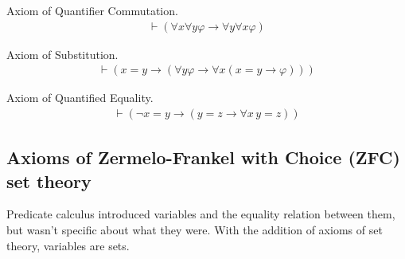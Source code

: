 \begin{axiom}\label{axi:ax-11} Axiom of Quantifier Commutation.  
\begin{align}
\vdash ( \forall x \forall y \varphi \rightarrow \forall y \forall x \varphi
    )\label{eq:ax-11}\tag{ax-11}
\end{align}
\end{axiom}
\begin{axiom}\label{axi:ax-12} Axiom of Substitution.  
\begin{align}
\vdash ( x = y \rightarrow ( \forall y \varphi \rightarrow \forall x ( x = y
    \rightarrow \varphi ) ) )\label{eq:ax-12}\tag{ax-12}
\end{align}
\end{axiom}
\begin{axiom}\label{axi:ax-13} Axiom of Quantified Equality. 
\begin{align}
\vdash ( \lnot x = y \rightarrow ( y = z \rightarrow \forall x \,y = z )
    )\label{eq:ax-13}\tag{ax-13}
\end{align}
\end{axiom}

\subsection{Axioms of Zermelo-Frankel with Choice (ZFC) set theory}\label{sec.zfc}

\pn Predicate calculus introduced variables and the equality relation between them, but wasn't specific
about what they were.  With the addition of axioms of set theory, variables are sets.


